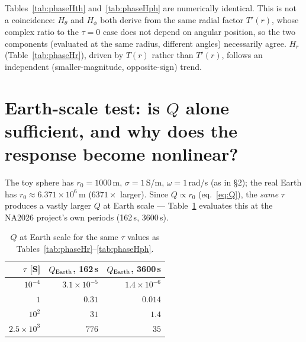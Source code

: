 \documentclass[11pt]{article}
\begin{document}
Tables~\ref{tab:phaseHth} and~\ref{tab:phaseHph} are numerically identical. This is not a coincidence:
$H_\theta$ and $H_\phi$ both derive from the same radial factor $T'(r)$, whose complex ratio to the
$\tau=0$ case does not depend on angular position, so the two components (evaluated at the same
radius, different angles) necessarily agree. $H_r$ (Table~\ref{tab:phaseHr}), driven by $T(r)$ rather
than $T'(r)$, follows an independent (smaller-magnitude, opposite-sign) trend.

\section{Earth-scale test: is $Q$ alone sufficient, and why does the response become nonlinear?}
\label{sec:earth}

The toy sphere has $r_0=1000$\,m, $\sigma=1$\,S/m, $\omega=1$\,rad/s (as in \S2); the real Earth has
$r_0\approx6.371\times10^6$\,m ($6371\times$ larger). Since $Q\propto r_0$ (eq.~\ref{eq:Q}), the
\emph{same} $\tau$ produces a vastly larger $Q$ at Earth scale --- Table~\ref{tab:earthQ} evaluates
this at the NA2026 project's own periods (162\,s, 3600\,s).

\begin{table}[h]
\centering
\begin{tabular}{r rr}
\toprule
$\tau$ [S] & $Q_{\rm Earth}$, 162\,s & $Q_{\rm Earth}$, 3600\,s \\
\midrule
$10^{-4}$ & $3.1\times10^{-5}$ & $1.4\times10^{-6}$ \\
$1$       & $0.31$ & $0.014$ \\
$10^{2}$  & $31$ & $1.4$ \\
$2.5\times10^{3}$ & $776$ & $35$ \\
\bottomrule
\end{tabular}
\caption{$Q$ at Earth scale for the same $\tau$ values as Tables~\ref{tab:phaseHr}--\ref{tab:phaseHph}.}
\label{tab:earthQ}
\end{table}
\end{document}
